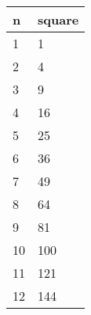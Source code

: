 \begin{tabular}{*{2}{l}}
\hline
n & square\\
\hline

1 & 1\\

2 & 4\\

3 & 9\\

4 & 16\\

5 & 25\\

6 & 36\\

7 & 49\\

8 & 64\\

9 & 81\\

10 & 100\\

11 & 121\\

12 & 144\\
\hline
\end{tabular}